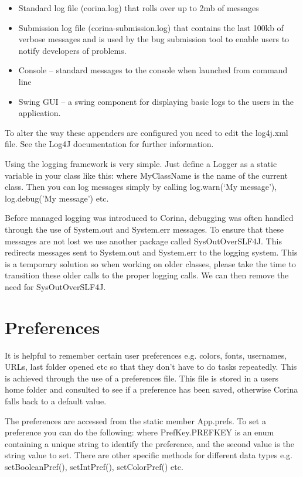 \begin{itemize}
 \item Standard log file (corina.log) that rolls over up to 2mb of messages
 \item Submission log file (corina-submission.log) that contains the last 100kb of verbose messages and is used by the bug submission tool to enable users to notify developers of problems.
 \item Console -- standard messages to the console when launched from command line
 \item Swing GUI -- a swing component for displaying basic logs to the users in the application.
\end{itemize}

To alter the way these appenders are configured you need to edit the log4j.xml file.  See the Log4J documentation for further information.

Using the logging framework is very simple.  Just define a Logger as a static variable in your class like this:
where MyClassName is the name of the current class.  Then you can log messages simply by calling log.warn(`My message'), log.debug('My message') etc.

Before managed logging was introduced to Corina, debugging was often handled through the use of System.out and System.err messages.  To ensure that these messages are not lost we use another package called SysOutOverSLF4J.  This redirects messages sent to System.out and System.err to the logging system.  This is a temporary solution so when working on older classes, please take the time to transition these older calls to the proper logging calls.  We can then remove the need for SysOutOverSLF4J.


\section{Preferences}
It is helpful to remember certain user preferences e.g. colors, fonts, usernames, URLs, last folder opened etc so that they don't have to do tasks repeatedly.  This is achieved through the use of a preferences file.  This file is stored in a users home folder and consulted to see if a preference has been saved, otherwise Corina falls back to a default value.  

The preferences are accessed from the static member App.prefs.  To set a preference you can do the following:
where PrefKey.PREFKEY is an enum containing a unique string to identify the preference, and the second value is the string value to set.  There are other specific methods for different data types e.g. setBooleanPref(), setIntPref(), setColorPref() etc.

